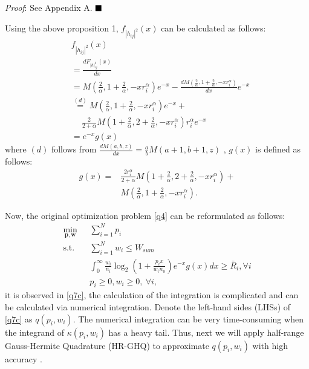 \documentclass[journal]{IEEEtran}
\begin{document}
\textit{Proof}: See Appendix A.  $\hfill\blacksquare$

Using the above proposition 1, $f_{\left|h_{ij} \right|^2} \left(x\right)$ can be calculated as follows:
\begin{align}
&f_{\left|h_{ij} \right|^2} \left(x\right)\nonumber \\ &= \frac{d F_{\left|h\right|_{ij}^2}\left(x\right)}{d x} \nonumber \\
&=M\left(\frac{2}{\alpha}, 1 + \frac{2}{\alpha}, -xr_i^{\alpha}\right)e^{-x} -\frac{d M\left(\frac{2}{\alpha}, 1 + \frac{2}{\alpha}, -x r_i^{\alpha}\right)}{d x} e^{-x} \nonumber \\
&\overset{\left(d\right)}{=} M\left(\frac{2}{\alpha}, 1 + \frac{2}{\alpha}, -xr_i^{\alpha}\right)e^{-x} + \nonumber \\ & \quad \ \frac{2}{2+\alpha}M\left(1 + \frac{2}{\alpha}, 2+\frac{2}{\alpha}, -xr_i^{\alpha}\right)r_i^{\alpha}e^{-x} \nonumber \\
& = e^{-x}g\left(x\right)
\end{align}
where $\left(d\right)$ follows from $\frac{d M\left(a, b, z\right)}{d x} = \frac{a}{b}M\left(a+1, b+1, z\right)$ \cite[13.4.8]{MAbramowitz}, $g\left(x\right)$ is defined as follows:
\begin{align}
g\left(x\right) =& \frac{2r_i^{\alpha}}{2+\alpha} M\left(1 + \frac{2}{\alpha}, 2+ \frac{2}{\alpha}, -xr_i^{\alpha}\right) + \nonumber \\ & M\left(\frac{2}{\alpha}, 1 + \frac{2}{\alpha}, -xr_i^{\alpha}\right).
\end{align}

Now, the original optimization problem \eqref{q4} can be reformulated as follows:
\begin{subequations}\label{q7}
	\begin{align}
	\min_{\mathbf{p}, \mathbf{w}}\ & \sum\limits_{i = 1}^{N} p_i \label{q7a} \\ \mbox{s.t.} \quad &  \sum\limits_{i = 1}^{N} w_i \leq W_{sum} \label{q7b} \\ \quad &  \int_{0}^{\infty} \frac{w_i}{n_i} \log_2\left(1 + \frac{p_i x}{w_i n_0}\right) e^{-x}g\left(x\right) dx \geq \bar{R}_i, \forall i \label{q7c}\\
	& p_i \geq 0, w_i \geq 0, \ \forall i, \label{q7d}
	\end{align}
\end{subequations}
it is observed in \eqref{q7c}, the calculation of the integration is complicated and can be calculated via numerical integration. Denote the left-hand sides (LHSs) of \eqref{q7c} as $q\left(p_i, w_i\right)$. The numerical integration can be very time-consuming when the integrand of $\kappa\left(p_i, w_i\right)$ has a heavy tail. Thus, next we will apply half-range Gauss-Hermite Quadrature (HR-GHQ) to approximate $q\left(p_i, w_i\right)$ with high accuracy \cite{JSBall,NMSteen}.
\end{document}
